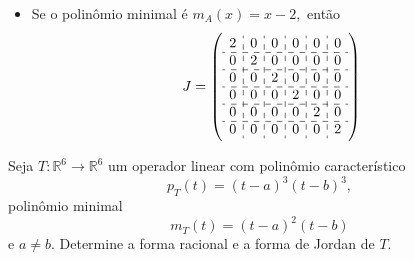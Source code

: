 \documentclass[11pt,a4paper]{article}
\begin{document}
{\begin{itemize}
\begin{itemize}
\[
\left(\begin{array}{cc:cc:cc}
2&0&0&0&0&0\\
1&2&0&0&0&0\\ \hdashline
0&0&2&0&0&0\\ 
0&0&1&2&0&0\\ \hdashline
0&0&0&0&2&0\\
0&0&0&0&1&2
\end{array}\right)\]
\item $(x-2)^2, (x-2)^2, x-2, x-2$
\[
\left(\begin{array}{cc:cc:c:c}
2&0&0&0&0&0\\
1&2&0&0&0&0\\ \hdashline
0&0&2&0&0&0\\ 
0&0&1&2&0&0\\ \hdashline
0&0&0&0&2&0\\ \hdashline
0&0&0&0&0&2
\end{array}\right)
\]
\item $(x-2)^2, x-2,x-2, x-2, x-2$
\[
\left(\begin{array}{cc:c:c:c:c}
2&0&0&0&0&0\\
1&2&0&0&0&0\\ \hdashline
0&0&2&0&0&0\\ \hdashline
0&0&0&2&0&0\\ \hdashline
0&0&0&0&2&0\\ \hdashline
0&0&0&0&0&2
\end{array}\right)
\]
\end{itemize}
\item Se o polinômio minimal é $m_A(x) = x-2,$ então
\[
J = \left(\begin{array}{c:c:c:c:c:c}
2&0&0&0&0&0\\ \hdashline
0&2&0&0&0&0\\ \hdashline
0&0&2&0&0&0\\ \hdashline
0&0&0&2&0&0\\ \hdashline
0&0&0&0&2&0\\ \hdashline
0&0&0&0&0&2
\end{array}\right)
\]
\end{itemize}
}
 Seja $T \colon \mathbb{R}^6 \to \mathbb{R}^6$ um operador linear com polinômio característico 
\[
p_T(t) = (t-a)^3(t-b)^3,
\]
polinômio minimal
\[
m_T(t) = (t-a)^2(t-b)
\]
e $a \neq b.$ Determine a forma racional e a forma de Jordan de $T.$
\end{document}
